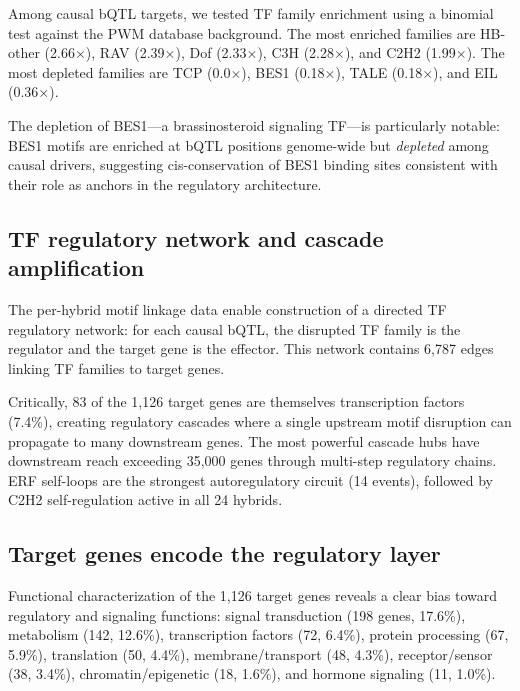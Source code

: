 \documentclass[11pt,a4paper]{article}
\begin{document}
Among causal bQTL targets, we tested TF family enrichment using a binomial
test against the PWM database background. The most enriched families are
HB-other (2.66$\times$), RAV (2.39$\times$), Dof (2.33$\times$), C3H
(2.28$\times$), and C2H2 (1.99$\times$). The most depleted families are TCP
(0.0$\times$), BES1 (0.18$\times$), TALE (0.18$\times$), and EIL
(0.36$\times$).

The depletion of BES1---a brassinosteroid signaling TF---is particularly
notable: BES1 motifs are enriched at bQTL positions genome-wide but
\emph{depleted} among causal drivers, suggesting cis-conservation of BES1
binding sites consistent with their role as anchors in the regulatory
architecture.


\subsection{TF regulatory network and cascade amplification}
\label{sec:network}

The per-hybrid motif linkage data enable construction of a directed TF
regulatory network: for each causal bQTL, the disrupted TF family is the
regulator and the target gene is the effector. This network contains 6,787
edges linking TF families to target genes.

Critically, 83 of the 1,126 target genes are themselves transcription factors
(7.4\%), creating regulatory cascades where a single upstream motif disruption
can propagate to many downstream genes. The most powerful cascade hubs have
downstream reach exceeding 35,000 genes through multi-step regulatory chains.
ERF self-loops are the strongest autoregulatory circuit (14 events), followed
by C2H2 self-regulation active in all 24 hybrids.


\subsection{Target genes encode the regulatory layer}
\label{sec:targets}

Functional characterization of the 1,126 target genes reveals a clear bias
toward regulatory and signaling functions: signal transduction (198 genes,
17.6\%), metabolism (142, 12.6\%), transcription factors (72, 6.4\%),
protein processing (67, 5.9\%), translation (50, 4.4\%), membrane/transport
(48, 4.3\%), receptor/sensor (38, 3.4\%), chromatin/epigenetic (18, 1.6\%),
and hormone signaling (11, 1.0\%).
\end{document}
